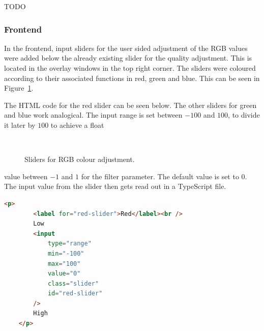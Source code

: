 \documentclass[../MasterThesis.tex]{subfiles}
\begin{document}
TODO

\subsubsection*{Frontend}
%
\vspace*{-1em}
\begin{minipage}{0.48\textwidth}
In the frontend, input sliders for the user sided adjustment of the RGB values were added below the already existing slider for the quality adjustment. This is located in the overlay windows in the top right corner. The sliders were coloured according to their associated functions in red, green and blue. This can be seen in Figure~\ref{figure:sliders}.

The HTML code for the red slider can be seen below. The other sliders for green and blue work analogical. The input range is set between $-100$ and $100$, to divide it later by $100$ to achieve a float 




\end{minipage}\begin{minipage}{0.04\textwidth}
\ 
\end{minipage}\begin{minipage}{0.48\textwidth}
\begin{figure}[H]
	\begin{center}
		\caption[Sliders for RGB colour adjustment.]{Sliders for RGB colour adjustment.}
		\label{figure:sliders}
	\end{center}
\end{figure}
\hfill
\end{minipage}

\vspace*{-1.3em}
value between $-1$ and $1$ for the filter parameter. The default value is set to $0$. The input value from the slider then gets read out in a TypeScript file.  


\begin{lstlisting}[language=html, numbers=none]
	<p>
		<label for="red-slider">Red</label><br />
		Low
		<input
			type="range"
			min="-100"
			max="100"
			value="0"
			class="slider"
			id="red-slider"
		/>
		High
	</p>
\end{lstlisting}






\end{document}
